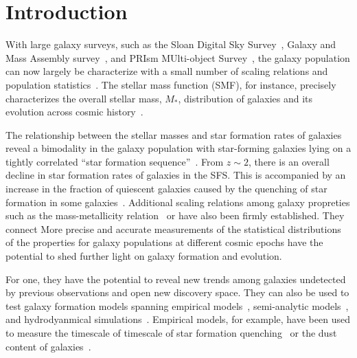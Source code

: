 \section{Introduction} \label{sec:intro} 
With large galaxy surveys, such as the Sloan Digital Sky
Survey~\citep[SDSS;][]{york2000}, Galaxy and Mass Assembly
survey~\citep[GAMA;][]{driver2011}, and 
PRIsm MUlti-object Survey~\citep[PRIMUS;][]{coil2011}, 
the galaxy population can now largely be characterize with a small number of
scaling relations and population 
statistics~\citep[see][for a review]{blanton2009}.
The stellar mass function (SMF), for instance, precisely characterizes the
overall stellar mass, $M_*$, distribution of galaxies and its
evolution across cosmic history~\citep{li2009, marchesini2009, moustakas2013,
muzzin2013, leja2019a, driver2022}.


The relationship between the stellar masses and star formation rates of
galaxies reveal a bimodality in the galaxy population with star-forming
galaxies lying on a tightly correlated ``star formation
sequence''~\citep[SFS;][]{noeske2007, daddi2007, salim2007, speagle2014,
hahn2019}.
From $z\sim 2$, there is an overall decline in star formation rates of galaxies
in the SFS. 
This is accompanied by an increase in the fraction of quiescent galaxies caused
by the quenching of star formation in some galaxies~\citep{kauffmann2003a,
blanton2003, baldry2006, taylor2009}. 
Additional scaling relations among galaxy propreties such as the
mass-metallicity relation~\citep{tremonti2004} or  have also been firmly established. 
They connect  
More precise and accurate measurements of the statistical distributions of the
properties for galaxy populations at different cosmic epochs have the potential
to shed further light on galaxy formation and evolution. 

For one, they have the potential to reveal new trends among galaxies undetected
by previous observations and open new discovery space.
They can also be used to test galaxy formation models spanning 
empirical models~\citep[\emph{e.g.} {\sc UniverseMachine};][]{behroozi2019}, 
semi-analytic models~\citep[\emph{e.g.}][]{benson2012, henriques2015,
somerville2015a}, and 
hydrodyanmical simulations~\citep[see][for a review]{somerville2015a}. 
Empirical models, for example, have been used to measure the timescale of 
timescale of star formation quenching~\citep{wetzel2013, hahn2017, tinker2017}
or the dust content of galaxies~\citep{hahn2021}. 

